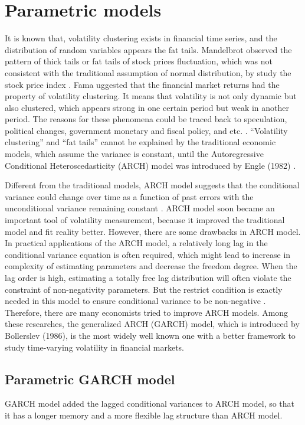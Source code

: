 \chapter{Parametric models}\label{secGarchmodel}
It is known that, volatility clustering exists in financial time series, and the distribution of random variables appears the fat tails. Mandelbrot observed the pattern of thick tails or fat tails of stock prices fluctuation, which was not consistent with the traditional assumption of normal distribution, by study the stock price index \cite{Mandelbrot1963}. 
Fama uggested that the financial market returns had the property of volatility clustering. It means that volatility is not only dynamic but also clustered, which appears strong in one certain period but weak in another period. The reasons for these phenomena could be traced back to speculation, political changes, government monetary and fiscal policy, and etc. \cite{EugeneF.Fama1965}. “Volatility clustering” and “fat tails” cannot be explained by the traditional economic models, which assume the variance is constant, until the Autoregressive Conditional Heteroscedasticity (ARCH) model was introduced by Engle (1982) \cite{Bollerslev1992}.


Different from the traditional models, ARCH model suggests that the conditional variance could change over time as a function of past errors with the unconditional variance remaining constant \cite{Engle1982}. ARCH model soon became an important tool of volatility measurement, because it improved the traditional model and fit reality better. However, there are some drawbacks in ARCH model. In practical applications of the ARCH model, a relatively long lag in the conditional variance equation is often required, which might lead to increase in complexity of estimating parameters and decrease the freedom degree. When the lag order is high, estimating a totally free lag distribution will often violate the constraint of non-negativity parameters. But the restrict condition is exactly needed in this model to ensure conditional variance to be non-negative \cite{Bollerslev1986}. Therefore, there are many economists tried to improve ARCH models. Among these researches, the generalized ARCH (GARCH) model, which is introduced by Bollerslev (1986), is the most widely well known one with a better framework to study time-varying volatility in financial markets. 

\section{Parametric GARCH model}
GARCH model added the lagged conditional variances to ARCH model, so that it has a longer memory and a more flexible lag structure than ARCH model.

